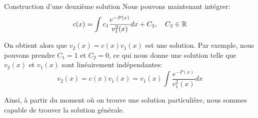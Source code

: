 \documentclass[a4paper]{article}
\begin{document}
\begin{parag}{Construction d'une deuxième solution}
        Nous pouvons maintenant intégrer: 
        \[c\left(x\right) = \int c_1 \frac{e^{-P\left(x\right)}}{v_1^2\left(x\right)}dx + C_2, \mathspace C_2 \in \mathbb{R}\]
        
        On obtient alors que $v_2\left(x\right) = c\left(x\right) v_1\left(x\right)$ est une solution. Par exemple, nous pouvons prendre $C_1 = 1$ et $C_2 = 0$, ce qui nous donne une solution telle que $v_2\left(x\right)$ et $v_1\left(x\right)$ sont linéairement indépendantes: 
        \[v_2\left(x\right) = c\left(x\right)v_1\left(x\right) = v_1\left(x\right) \int \frac{e^{-P\left(x\right)}}{v_1^2\left(x\right)}dx\]

        Ainsi, à partir du moment où on trouve une solution particulière, nous sommes capable de trouver la solution générale.
\end{parag}
\end{document}
